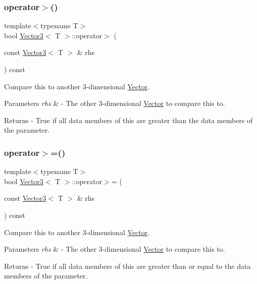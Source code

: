 \subsubsection{\texorpdfstring{operator$>$()}{operator>()}}
{\footnotesize\ttfamily template$<$typename T$>$ \\
bool \mbox{\hyperlink{class_vector3}{Vector3}}$<$ T $>$\+::operator$>$ (\begin{DoxyParamCaption}\item[{const \mbox{\hyperlink{class_vector3}{Vector3}}$<$ T $>$ \&}]{rhs }\end{DoxyParamCaption}) const}

Compare this to another 3-\/dimensional \mbox{\hyperlink{class_vector}{Vector}}. 
\begin{DoxyParams}{Parameters}
{\em rhs} & -\/ The other 3-\/dimensional \mbox{\hyperlink{class_vector}{Vector}} to compare this to. \\
\hline
\end{DoxyParams}
\begin{DoxyReturn}{Returns}
-\/ True if all data members of this are greater than the data members of the parameter. 
\end{DoxyReturn}
\mbox{\label{class_vector3_a9c0fd2c3f2cce9af0711f9ea40bff86a}} 
\subsubsection{\texorpdfstring{operator$>$=()}{operator>=()}}
{\footnotesize\ttfamily template$<$typename T$>$ \\
bool \mbox{\hyperlink{class_vector3}{Vector3}}$<$ T $>$\+::operator$>$= (\begin{DoxyParamCaption}\item[{const \mbox{\hyperlink{class_vector3}{Vector3}}$<$ T $>$ \&}]{rhs }\end{DoxyParamCaption}) const}

Compare this to another 3-\/dimensional \mbox{\hyperlink{class_vector}{Vector}}. 
\begin{DoxyParams}{Parameters}
{\em rhs} & -\/ The other 3-\/dimensional \mbox{\hyperlink{class_vector}{Vector}} to compare this to. \\
\hline
\end{DoxyParams}
\begin{DoxyReturn}{Returns}
-\/ True if all data members of this are greater than or equal to the data members of the parameter. 
\end{DoxyReturn}
\mbox{\label{class_vector3_a9bc4a07b903235d5a0c81eeb75e856e0}} 
